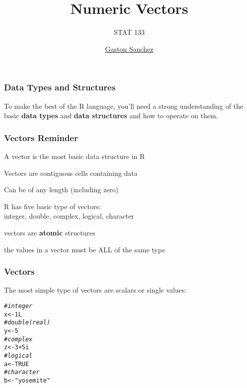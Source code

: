 \documentclass[12pt]{beamer}\usepackage[]{graphicx}\usepackage[]{color}
\title{Numeric Vectors}
\subtitle{STAT 133}
\author{\href{http://www.gastonsanchez.com}{Gaston Sanchez}}
\institute{\href{https://github.com/ucb-stat133/stat133-fall-2016}{\tt \scriptsize \color{foreground} github.com/ucb-stat133/stat133-fall-2016}}
\date{}
\makeatletter
\newcommand{\hlnum}[1]{\textcolor[rgb]{0.686,0.059,0.569}{#1}}%
\newcommand{\hlstr}[1]{\textcolor[rgb]{0.192,0.494,0.8}{#1}}%
\newcommand{\hlcom}[1]{\textcolor[rgb]{0.678,0.584,0.686}{\textit{#1}}}%
\newcommand{\hlopt}[1]{\textcolor[rgb]{0,0,0}{#1}}%
\newcommand{\hlstd}[1]{\textcolor[rgb]{0.345,0.345,0.345}{#1}}%
\newcommand{\hlkwb}[1]{\textcolor[rgb]{0.69,0.353,0.396}{#1}}%
\newenvironment{kframe}{%
 \def\at@end@of@kframe{}%
 \ifinner\ifhmode%
  \def\at@end@of@kframe{\end{minipage}}%
  \begin{minipage}{\columnwidth}%
 \fi\fi%
 \def\FrameCommand##1{\hskip\@totalleftmargin \hskip-\fboxsep
 \colorbox{shadecolor}{##1}\hskip-\fboxsep
     \hskip-\linewidth \hskip-\@totalleftmargin \hskip\columnwidth}%
 \MakeFramed {\advance\hsize-\width
   \@totalleftmargin\z@ \linewidth\hsize
   \@setminipage}}%
 {\par\unskip\endMakeFramed%
 \at@end@of@kframe}
\newenvironment{knitrout}{}{} %
\makeatother
\begin{document}
{
  \frame{
    \titlepage
  } 
}


\begin{frame}
\frametitle{Data Types and Structures}

To make the best of the R language, you'll need a strong understanding of the basic \textbf{data types} and \textbf{data structures} and how to operate on them.

\end{frame}


\begin{frame}
\begin{center}
\Huge{}
\end{center}
\end{frame}


\begin{frame}
\frametitle{Vectors Reminder}

\bi
  \item A vector is the most basic data structure in R
  \item Vectors are contiguous cells containing data
  \item Can be of any length (including zero)
  \item R has five basic type of vectors: \\
  integer, double, complex, logical, character
  \item vectors are \textbf{atomic} structures
  \item the values in a vector must be ALL of the same type 
\ei

\end{frame}


\begin{frame}[fragile]
\frametitle{Vectors}

The most simple type of vectors are scalars or single values:
\begin{knitrout}\footnotesize
{}\color{fgcolor}\begin{kframe}
\begin{alltt}
\hlcom{# integer}
\hlstd{x} \hlkwb{<-} \hlnum{1L}
\hlcom{# double (real)}
\hlstd{y} \hlkwb{<-} \hlnum{5}
\hlcom{# complex}
\hlstd{z} \hlkwb{<-} \hlnum{3} \hlopt{+} \hlnum{5i}
\hlcom{# logical}
\hlstd{a} \hlkwb{<-} \hlnum{TRUE}
\hlcom{# character}
\hlstd{b} \hlkwb{<-} \hlstr{"yosemite"}
\end{alltt}
\end{kframe}
\end{knitrout}

\end{frame}
\end{document}
